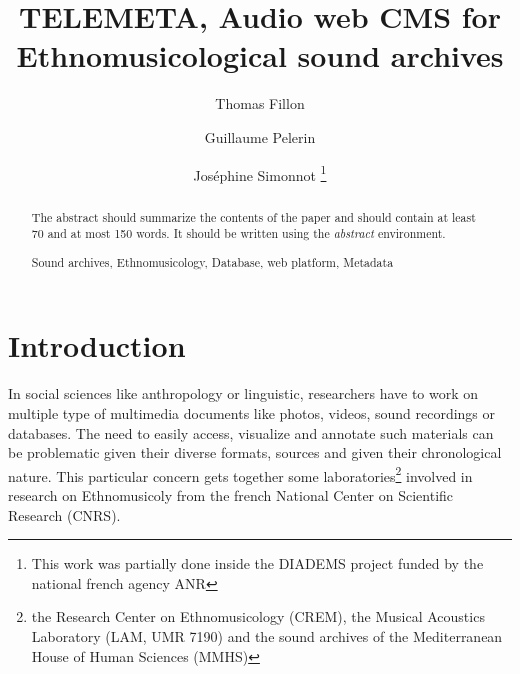 \documentclass[runningheads,a4paper]{llncs}
\newcommand{\keywords}[1]{\par\addvspace\baselineskip
\noindent\keywordname\enspace\ignorespaces#1}
\begin{document}
\mainmatter  %

\title{TELEMETA, Audio web CMS for Ethnomusicological sound archives}


%
%
\author{Thomas Fillon \and Guillaume Pelerin
 \and Jos{\'e}phine Simonnot 
\thanks{This work was partially done inside the DIADEMS project funded by the national french agency ANR }
}
%


\maketitle

\setcounter{footnote}{0}


\begin{abstract}
The abstract should summarize the contents of the paper and should
contain at least 70 and at most 150 words. It should be written using the
\emph{abstract} environment.
\keywords{Sound archives, Ethnomusicology, Database, web platform, Metadata}
\end{abstract}


\section{Introduction}

In social sciences like anthropology or linguistic, researchers have to work on multiple type of multimedia documents like photos, videos, sound recordings or databases. The need to easily access, visualize and annotate such materials can be problematic given their diverse formats, sources and given their chronological nature.
This particular concern gets together some laboratories\footnote{the Research Center on Ethnomusicology (CREM), the Musical Acoustics Laboratory (LAM, UMR 7190) and the sound archives of the Mediterranean House of Human Sciences (MMHS)} involved in research on Ethnomusicoly from  the french National Center on Scientific Research (CNRS).
\end{document}
